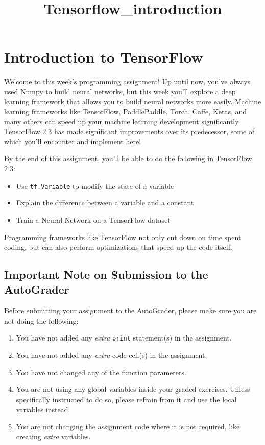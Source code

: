 \documentclass[11pt]{article}
\title{Tensorflow\_introduction}
\providecommand{\tightlist}{%
      \setlength{\itemsep}{0pt}\setlength{\parskip}{0pt}}
\begin{document}
    
    \maketitle
    
    

    
    \hypertarget{introduction-to-tensorflow}{%
\section{Introduction to TensorFlow}\label{introduction-to-tensorflow}}

Welcome to this week's programming assignment! Up until now, you've
always used Numpy to build neural networks, but this week you'll explore
a deep learning framework that allows you to build neural networks more
easily. Machine learning frameworks like TensorFlow, PaddlePaddle,
Torch, Caffe, Keras, and many others can speed up your machine learning
development significantly. TensorFlow 2.3 has made significant
improvements over its predecessor, some of which you'll encounter and
implement here!

By the end of this assignment, you'll be able to do the following in
TensorFlow 2.3:

\begin{itemize}
\tightlist
\item
  Use \texttt{tf.Variable} to modify the state of a variable
\item
  Explain the difference between a variable and a constant
\item
  Train a Neural Network on a TensorFlow dataset
\end{itemize}

Programming frameworks like TensorFlow not only cut down on time spent
coding, but can also perform optimizations that speed up the code
itself.

\hypertarget{important-note-on-submission-to-the-autograder}{%
\subsection{Important Note on Submission to the
AutoGrader}\label{important-note-on-submission-to-the-autograder}}

Before submitting your assignment to the AutoGrader, please make sure
you are not doing the following:

\begin{enumerate}
\def\labelenumi{\arabic{enumi}.}
\tightlist
\item
  You have not added any \emph{extra} \texttt{print} statement(s) in the
  assignment.
\item
  You have not added any \emph{extra} code cell(s) in the assignment.
\item
  You have not changed any of the function parameters.
\item
  You are not using any global variables inside your graded exercises.
  Unless specifically instructed to do so, please refrain from it and
  use the local variables instead.
\item
  You are not changing the assignment code where it is not required,
  like creating \emph{extra} variables.
\end{enumerate}
\end{document}
